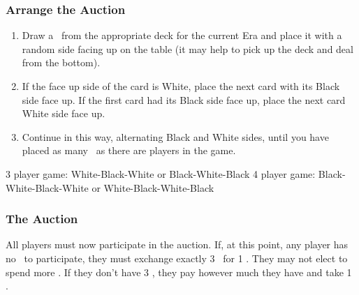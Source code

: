 \documentclass[10pt,twocolumn]{article}
\begin{document}
\subsubsection{Arrange the Auction}
\begin{enumerate}
\item Draw a \landcard\ from the appropriate deck for the current Era and place it with a random side facing up on the table (it may help to pick up the deck and deal from the bottom).
\item If the face up side of the card is White, place the next card with its Black side face up. If the first card had its Black side face up, place the next card White side face up.
\item Continue in this way, alternating Black and White sides, until you have placed as many \landcards\ as there are players in the game.
\iftoggle{original-rules}{}{\item If playing with 3 players, keep track of the colour the round started with and start the next round with the opposite colour. So if one round comes up White-Black-White, the following round should be Black-White-Black, the round after that White-Black-White again and so on.}
\end{enumerate}
\begin{BoxExample}3 player game: White-Black-White or Black-White-Black
4 player game: Black-White-Black-White or White-Black-White-Black\end{BoxExample}


\subsubsection{The Auction}
All players must now participate in the auction. If, at this point, any player has no \money\ to participate, they must exchange exactly 3 \vps\ for 1 \money. They may not elect to spend more \vps. If they don't have 3 \vps, they pay however much they have and take 1 \money.
\end{document}
